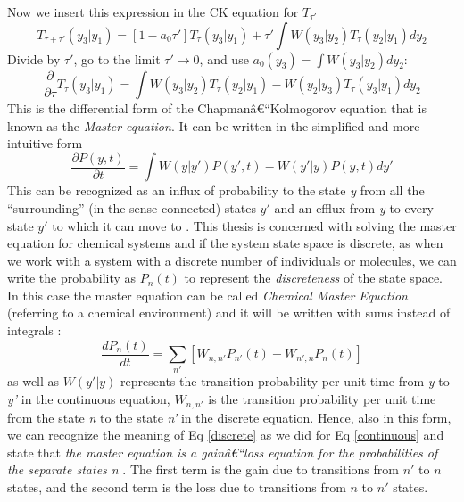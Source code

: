 \documentclass[12pt,a4paper]{report}
\begin{document}
Now we insert this expression in the CK equation for $T_{\tau'}$
\begin{equation}
    T_{\tau+\tau'}(y_{3}|y_{1}) = [1 - a_{0}\tau']T_{\tau}(y_{3}|y_{1})+ \tau'\int W(y_{3}|y_{2})T_{\tau}(y_{2}|y_{1})dy_{2}
\end{equation}
Divide by $\tau'$, go to the limit $\tau' \rightarrow 0$, and use $a_{0}(y_{3})=\int W(y_{3}|y_{2}) dy_{2}$:
\begin{equation}
    \frac{\partial }{\partial \tau}T_{\tau}(y_{3}|y_{1}) = \int {W(y_{3}|y_{2})T_{\tau}(y_{2}|y_{1}) - W(y_{2}|y_{3})T_{\tau}(y_{3}|y_{1})}dy_{2}
\end{equation}
This is the differential form of the Chapmanâ€“Kolmogorov equation that is known as the \emph{Master equation}. It can be written in the simplified and more intuitive form
\begin{equation}\label{continuous}
    \frac{\partial P(y,t)}{\partial t} = \int {W(y|y')P(y',t)-W(y'|y)P(y,t)}dy'
\end{equation}
This can be recognized as an influx of probability to the state \emph{y} from all the ``surrounding'' (in the sense connected) states $y'$ and an efflux from \emph{y} to every state $y'$ to which it can move to \cite{PHD}. This thesis is concerned with solving the master equation for chemical systems and if the system state space is discrete, as when we work with a system with a discrete number of individuals or molecules, we can write the probability as $P_{n}(t)$ to represent the \emph{discreteness} of the state space. In this case the master equation can be called \emph{Chemical Master Equation} (referring to a chemical environment) and it will be written with sums instead of integrals \cite{PHD}:
\begin{equation}\label{discrete}
        \frac{dP_{n}(t)}{dt} = \sum_{n'}[W_{n,n'}P_{n'}(t)-W_{n',n}P_{n}(t)]
\end{equation}
as well as $W(y'|y)$ represents the transition probability per unit time from \emph{y} to \emph{y'} in the continuous equation, $W_{n,n'}$ is the transition probability per unit time from the state \emph{n} to the state \emph{n'} in the discrete equation. Hence, also in this form, we can recognize the meaning of Eq \ref{discrete} as we did for Eq \ref{continuous} and state that \emph{the master equation is a gainâ€“loss equation for the probabilities of the separate states n} \cite{Math}.  The first term is the gain due to transitions from $n'$ to $n$ states, and the second term is the loss due to transitions from $n$ to $n'$ states.
\end{document}
